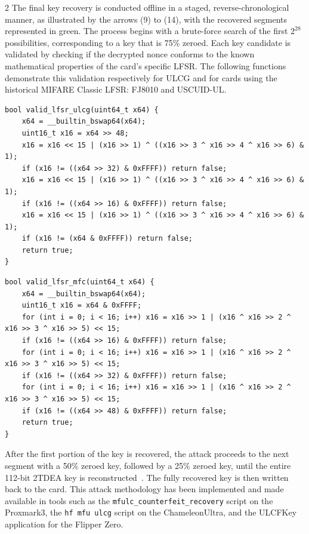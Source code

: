 \documentclass[10pt,letterpaper]{article}
\begin{document}
\begin{multicols}{2}
The final key recovery is conducted offline in a staged, reverse-chronological manner, as illustrated by the arrows (9) to (14), with the recovered segments represented in green. The process begins with a brute-force search of the first $2^{28}$ possibilities, corresponding to a key that is 75\% zeroed. Each key candidate is validated by checking if the decrypted nonce conforms to the known mathematical properties of the card's specific LFSR. The following functions demonstrate this validation respectively for ULCG and for cards using the historical MIFARE Classic LFSR: FJ8010 and USCUID-UL.
\begin{lstlisting}[style=customc]
bool valid_lfsr_ulcg(uint64_t x64) {
    x64 = __builtin_bswap64(x64);
    uint16_t x16 = x64 >> 48;
    x16 = x16 << 15 | (x16 >> 1) ^ ((x16 >> 3 ^ x16 >> 4 ^ x16 >> 6) & 1);
    if (x16 != ((x64 >> 32) & 0xFFFF)) return false;
    x16 = x16 << 15 | (x16 >> 1) ^ ((x16 >> 3 ^ x16 >> 4 ^ x16 >> 6) & 1);
    if (x16 != ((x64 >> 16) & 0xFFFF)) return false;
    x16 = x16 << 15 | (x16 >> 1) ^ ((x16 >> 3 ^ x16 >> 4 ^ x16 >> 6) & 1);
    if (x16 != (x64 & 0xFFFF)) return false;
    return true;
}
\end{lstlisting}
\columnbreak
\begin{lstlisting}[style=customc]
bool valid_lfsr_mfc(uint64_t x64) {
    x64 = __builtin_bswap64(x64);
    uint16_t x16 = x64 & 0xFFFF;
    for (int i = 0; i < 16; i++) x16 = x16 >> 1 | (x16 ^ x16 >> 2 ^ x16 >> 3 ^ x16 >> 5) << 15;
    if (x16 != ((x64 >> 16) & 0xFFFF)) return false;
    for (int i = 0; i < 16; i++) x16 = x16 >> 1 | (x16 ^ x16 >> 2 ^ x16 >> 3 ^ x16 >> 5) << 15;
    if (x16 != ((x64 >> 32) & 0xFFFF)) return false;
    for (int i = 0; i < 16; i++) x16 = x16 >> 1 | (x16 ^ x16 >> 2 ^ x16 >> 3 ^ x16 >> 5) << 15;
    if (x16 != ((x64 >> 48) & 0xFFFF)) return false;
    return true;
}
\end{lstlisting}

After the first portion of the key is recovered, the attack proceeds to the next segment with a 50\% zeroed key, followed by a 25\% zeroed key, until the entire 112-bit 2TDEA key is reconstructed~\cite{article3940}. The fully recovered key is then written back to the card. This attack methodology has been implemented and made available in tools such as the \texttt{mfulc\_counterfeit\_recovery} script on the Proxmark3, the \texttt{hf mfu ulcg} script on the ChameleonUltra, and the ULCFKey application for the Flipper Zero.


\end{multicols}
\end{document}
